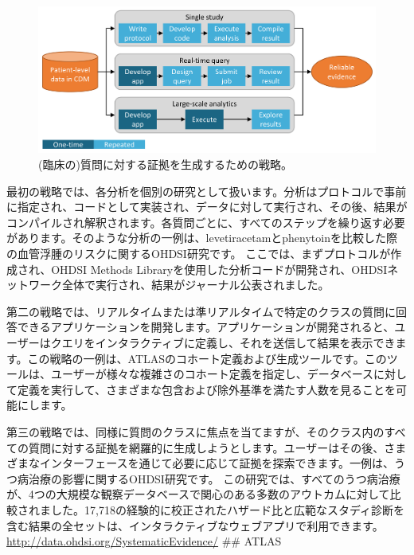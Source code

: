 \documentclass[
  11pt]{book}
\theoremstyle{definition}
\theoremstyle{definition}
\theoremstyle{definition}
\theoremstyle{definition}
\theoremstyle{remark}
\begin{document}
\begin{figure}

{\centering \includegraphics[width=0.9\linewidth]{images/OhdsiAnalyticsTools/strategies} 

}

\caption{(臨床の)質問に対する証拠を生成するための戦略。}\label{fig:strategies}
\end{figure}

最初の戦略では、各分析を個別の研究として扱います。分析はプロトコルで事前に指定され、コードとして実装され、データに対して実行され、その後、結果がコンパイルされ解釈されます。各質問ごとに、すべてのステップを繰り返す必要があります。そのような分析の一例は、levetiracetamとphenytoinを比較した際の血管浮腫のリスクに関するOHDSI研究です。 \citep{duke_2017} ここでは、まずプロトコルが作成され、OHDSI Methods Libraryを使用した分析コードが開発され、OHDSIネットワーク全体で実行され、結果がジャーナル公表されました。

第二の戦略では、リアルタイムまたは準リアルタイムで特定のクラスの質問に回答できるアプリケーションを開発します。アプリケーションが開発されると、ユーザーはクエリをインタラクティブに定義し、それを送信して結果を表示できます。この戦略の一例は、ATLASのコホート定義および生成ツールです。このツールは、ユーザーが様々な複雑さのコホート定義を指定し、データベースに対して定義を実行して、さまざまな包含および除外基準を満たす人数を見ることを可能にします。

第三の戦略では、同様に質問のクラスに焦点を当てますが、そのクラス内のすべての質問に対する証拠を網羅的に生成しようとします。ユーザーはその後、さまざまなインターフェースを通じて必要に応じて証拠を探索できます。一例は、うつ病治療の影響に関するOHDSI研究です。 \citep{schuemie_2018b} この研究では、すべてのうつ病治療が、4つの大規模な観察データベースで関心のある多数のアウトカムに対して比較されました。17,718の経験的に校正されたハザード比と広範なスタディ診断を含む結果の全セットは、インタラクティブなウェブアプリで利用できます。\url{http://data.ohdsi.org/SystematicEvidence/}
\#\# ATLAS
\end{document}
